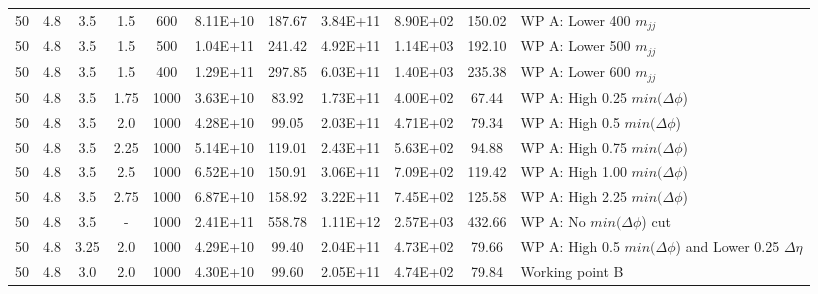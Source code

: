 {\begin{tabular}{|c|c|c|c|c||c|c||c|c|c|l|}
50 & 4.8 & 3.5  & 1.5  & 600  & \num{8.11E+10} &    187.67  & \num{3.84E+11} &    \num{8.90E+02} & 150.02  & WP A: Lower 400 $m_{jj}$ \\
50 & 4.8 & 3.5  & 1.5  & 500  & \num{1.04E+11} &    241.42  & \num{4.92E+11} &    \num{1.14E+03} & 192.10  & WP A: Lower 500 $m_{jj}$ \\
50 & 4.8 & 3.5  & 1.5  & 400  & \num{1.29E+11} &    297.85  & \num{6.03E+11} &    \num{1.40E+03} & 235.38  & WP A: Lower 600 $m_{jj}$ \\
\hline\hline
50 & 4.8 & 3.5  & 1.75 & 1000 & \num{3.63E+10} &    83.92   & \num{1.73E+11} &    \num{4.00E+02} & 67.44   & WP A: High 0.25 $min(\Delta\phi$) \\
50 & 4.8 & 3.5  & 2.0  & 1000 & \num{4.28E+10} &    99.05   & \num{2.03E+11} &    \num{4.71E+02} & 79.34   & WP A: High 0.5 $min(\Delta\phi$) \\
50 & 4.8 & 3.5  & 2.25 & 1000 & \num{5.14E+10} &    119.01  & \num{2.43E+11} &    \num{5.63E+02} & 94.88   & WP A: High 0.75 $min(\Delta\phi$) \\
50 & 4.8 & 3.5  & 2.5  & 1000 & \num{6.52E+10} &    150.91  & \num{3.06E+11} &    \num{7.09E+02} & 119.42  & WP A: High 1.00 $min(\Delta\phi$) \\
50 & 4.8 & 3.5  & 2.75 & 1000 & \num{6.87E+10} &    158.92  & \num{3.22E+11} &    \num{7.45E+02} & 125.58  & WP A: High 2.25 $min(\Delta\phi$) \\
50 & 4.8 & 3.5  & -    & 1000 & \num{2.41E+11} &    558.78  & \num{1.11E+12} &    \num{2.57E+03} & 432.66  & WP A: No $min(\Delta\phi$) cut\\
\hline\hline
50 & 4.8 & 3.25 & 2.0  & 1000 & \num{4.29E+10} &    99.40   & \num{2.04E+11} &    \num{4.73E+02} & 79.66   & WP A: High 0.5 $min(\Delta\phi$) and Lower 0.25 $\Delta\eta$\\
50 & 4.8 & 3.0  & 2.0  & 1000 & \num{4.30E+10} &    99.60   & \num{2.05E+11} &    \num{4.74E+02} & 79.84   & Working point B \\
\hline
\end{tabular}
}

